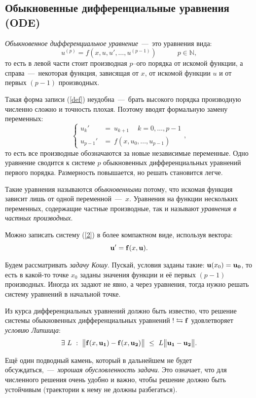 \documentclass[a4,14pt,russian]{article}
\begin{document}
\subsection{Обыкновенные дифференциальные уравнения (ODE)}
    {\it Обыкновенное дифференциальное уравнение}~---~это уравнения вида: \\
        \begin{equation}\label{def}
            u^{(p)} = f(x, u, u',\dots, u^{(p-1)}) \quad\quad\quad
            p \in \mathbb{N},
        \end{equation}
    то есть в левой части стоит производная $p$--ого порядка от искомой функции, а справа~---~некоторая функция, зависящая от $x$, от искомой функции $u$ и от первых $(p-1)$ производных.\par
    Такая форма записи (\ref{def}) неудобна~---~брать высокого порядка производную численно сложно и точность плохая. Поэтому вводят формальную замену переменных:
    \begin{equation}\label{2}
        \begin{cases}
            u_k' &=\ u_{k+1} \quad\ k = 0, \ldots, p-1\\
            u_{p-1}'& =\ f(x,u_0,\ldots, u_{p-1})
        \end{cases},
    \end{equation}
    то есть все производные обозначаются за новые независимые переменные. Одно уравнение сводится к системе $p$ обыкновенных дифференциальных уравнений первого порядка. Размерность повышается, но решать становится легче.\par
    Такие уравнения называются {\it обыкновенными} потому, что искомая функция зависит лишь от одной переменной~---~$x$. Уравнения на функции нескольких переменных, содержащие частные производные, так и называют {\it уравнения в частных производных}.\par
    Можно записать систему (\ref{2}) в более компактном виде, используя вектора: $${\bf u}' = {\bf f}(x, {\bf u}).$$\par
    Будем рассматривать {\it задачу Кошу}. Пускай, условия заданы такие: ${\bf u}(x_0)={\bf u_0}$, то есть в какой-то точке $x_0$ заданы значения функции и её первых $(p-1)$ производных. Иногда их задают не явно, а через уравнения, тогда нужно решать систему уравнений в начальной точке.\par
    Из курса дифференциальных уравнений должно быть известно, что решение системы обыкновенных дифференциальных уравнений $! \leftrightarrows {\bf f}$ удовлетворяет {\it условию Липшица}:
    \begin{equation}\label{liv}
        \exists\ L\ :\ \bigl\|{\bf f}(x, {\bf u_1}) - {\bf f}(x, {\bf u_2})\bigr\| \  \le \ L\bigl\|{\bf u_1}-{\bf u_2}\bigr\|.
    \end{equation}
    \par
    Ещё один подводный камень, который в дальнейшем не будет обсуждаться,~---~{\it хорошая обусловленность задачи}. Это означает, что для численного решения очень удобно и важно, чтобы решение должно быть устойчивым (траектории к нему не должны разбегаться).
\end{document}
